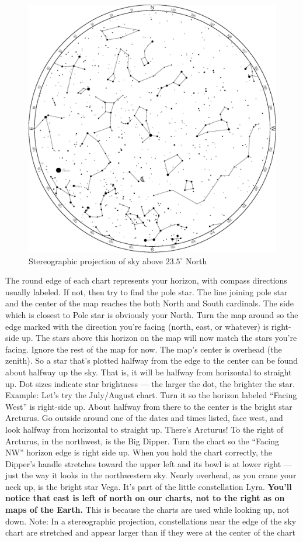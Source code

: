\documentclass[a4paper,12pt]{extarticle}
\begin{document}
\begin{figure}[H]
    \centering
    \includegraphics[width=0.9\linewidth]{stereo_1.eps}
    \caption{Stereographic projection of sky above $23.5^\circ$ North}
    \label{stereo_2}
\end{figure}

The round edge of each chart represents your horizon, with compass directions usually labeled. If not, then try to find the pole star. The line joining pole star and the center of the map reaches the both North and South cardinals. The side which is closest to Pole star is obviously your North. Turn the map around so the edge marked with the direction you’re facing (north, east, or whatever) is right-side up. The stars above this horizon on the map will now match the stars you’re facing. Ignore the rest of the map for now. The map’s center is overhead (the zenith). So a star that’s plotted halfway from the edge to the center can be found about halfway up the sky. That is, it will be halfway from horizontal to straight up. Dot sizes indicate star brightness — the larger the dot, the brighter the star. Example: Let’s try the July/August chart. Turn it so the horizon labeled “Facing West” is right-side up. About halfway from there to the center is the bright star Arcturus. Go outside around one of the dates and times listed, face west, and look halfway from horizontal to straight up. There’s Arcturus! To the right of Arcturus, in the northwest, is the Big Dipper. Turn the chart so the “Facing NW” horizon edge is right side up. When you hold the chart correctly, the Dipper’s handle stretches toward the upper left and its bowl is at lower right — just the way it looks in the northwestern sky. Nearly overhead, as you crane your neck up, is the bright star Vega. It’s part of the little constellation Lyra. \textbf{You’ll notice that east is left of north on our charts, not to the right as on maps of the Earth.} This is because the charts are used while looking up, not down. Note: In a stereographic projection, constellations near the edge of the sky chart are stretched and appear larger than if they were at the center of the chart
\end{document}
